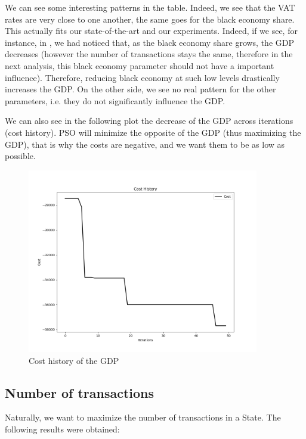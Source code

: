         We can see some interesting patterns in the table. Indeed, we see that the VAT rates are very close to one another, the same goes for the black economy share. This actually fits our state-of-the-art and our experiments. Indeed, if we see, for instance, in , we had noticed that, as the black economy share grows, the GDP decreases (however the number of transactions stays the same, therefore in the next analysis, this black economy parameter should not have a important influence). Therefore, reducing black economy at such low levels drastically increases the GDP.
        On the other side, we see no real pattern for the other parameters, i.e. they do not significantly influence the GDP.

        We can also see in the following plot the decrease of the GDP across iterations (cost history). PSO will minimize the opposite of the GDP (thus maximizing the GDP), that is why the costs are negative, and we want them to be as low as possible.

        \begin{figure}[H]
            \centering
            \includegraphics[width=0.9\textwidth]{img/opti/costHistoryGDP.png}
            \caption{Cost history of the GDP}
        \end{figure}


    \subsection{Number of transactions}

        Naturally, we want to maximize the number of transactions in a State. The following results were obtained:
    
